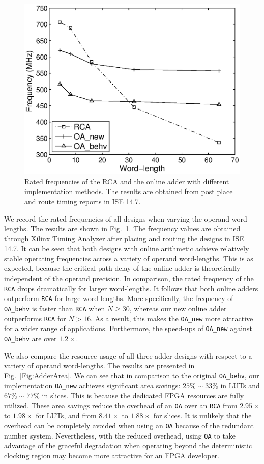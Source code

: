 \documentclass[conference]{IEEEtran}
\begin{document}
\begin{figure}[tbp]
	\centering
	\includegraphics[width=.45\textwidth]{./Figures/Exp/Adder_Freq.eps}
	\caption{Rated frequencies of the RCA and the online adder with different implementation methods. The results are obtained from post place and route timing reports in ISE 14.7.}
	\label{Fig:AdderFreq}
	\vspace{-1ex}
\end{figure}


We record the rated frequencies of all designs when varying the operand word-lengths. The results are shown in Fig.~\ref{Fig:AdderFreq}. The frequency values are obtained through Xilinx Timing Analyzer after placing and routing the designs in ISE 14.7. It can be seen that both designs with online arithmetic achieve relatively stable operating frequencies across a variety of operand word-lengths. This is as expected, because the critical path delay of the online adder is theoretically independent of the operand precision. In comparison, the rated frequency of the \texttt{RCA} drops dramatically for larger word-lengths. It follows that both online adders outperform \texttt{RCA} for large word-lengths. More specifically, the frequency of \texttt{OA\_behv} is faster than \texttt{RCA} when $N\geqslant30$, whereas our new online adder outperforms \texttt{RCA} for $N>16$. As a result, this makes the \texttt{OA\_new} more attractive for a wider range of applications. Furthermore, the speed-ups of \texttt{OA\_new} against \texttt{OA\_behv} are over $1.2\times$.



We also compare the resource usage of all three adder designs with respect to a variety of operand word-lengths. The results are presented in Fig.~\ref{Fig:AdderArea}. We can see that in comparison to the original \texttt{OA\_behv}, our implementation \texttt{OA\_new} achieves significant area savings: $25\%\sim 33\%$ in LUTs and $67\%\sim77\%$ in slices. This is because the dedicated FPGA resources are fully utilized. These area savings reduce the overhead of an \texttt{OA} over an \texttt{RCA} from $2.95\times$ to $1.98\times$ for LUTs, and from $8.41\times$ to $1.88\times$ for slices. It is unlikely that the overhead can be completely avoided when using an \texttt{OA} because of the redundant number system. Nevertheless, with the reduced overhead, using \texttt{OA} to take advantage of the graceful degradation when operating beyond the deterministic clocking region may become more attractive for an FPGA developer.
\end{document}
